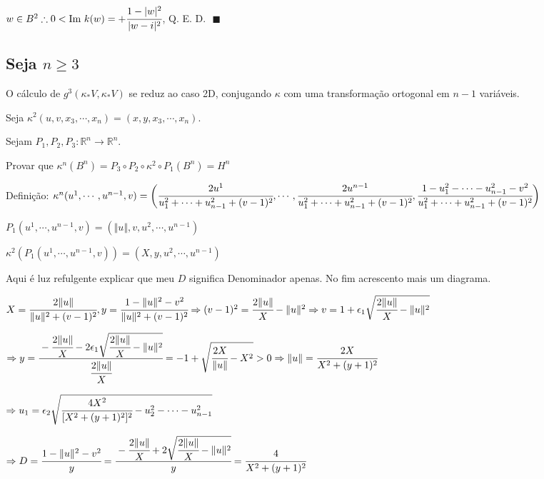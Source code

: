 \documentclass[10pt,a4paper]{article}
\begin{document}
		$w \in B^2 \therefore 0 < \text{Im } k(w) = + \cfrac{1 - \vert w \vert^2}{\vert w - i \vert^2}$, Q. E. D. $\,\,\blacksquare$

		\subsection{Seja $n \ge 3$}
		\begin{flushright}
		\end{flushright}

		O c\'alculo de $g^3 (\kappa_* V, \kappa_* V)$ se reduz ao caso 2D, conjugando $\kappa$ com uma transforma\c{c}\~ao ortogonal em $n - 1$ vari\'aveis.

		Seja $\kappa^2(u, v, x_3, \cdots, x_n) = (x, y, x_3, \cdots, x_n)$.

		Sejam $P_1, P_2, P_3 : \mathbb{R}^n \rightarrow \mathbb{R}^n$.

		Provar que $\kappa^n(B^n) = P_3 \circ P_2 \circ \kappa^2 \circ P_1 (B^n) = H^n$

		Defini\c{c}\~ao: $\kappa^n(u^1, \cdots, u^{n-1}, v) = \bigg( \cfrac{2 u^1}{u_1^2 + \cdots + u_{n-1}^2 + (v - 1)^2}, \cdots, \cfrac{2 u^{n-1}}{u_1^2 + \cdots + u_{n-1}^2 + (v - 1)^2}, \cfrac{1 - u_1^2 - \cdots - u_{n-1}^2 - v^2}{u_1^2 + \cdots + u_{n-1}^2 + (v - 1)^2}  \bigg)$

		$P_1(u^1, \cdots, u^{n-1}, v) = (\Vert u \Vert, v, u^2, \cdots, u^{n-1})$

		$\kappa^2(P_1(u^1, \cdots, u^{n-1}, v)) = (X, y, u^2, \cdots, u^{n-1})$

		Aqui \'e luz refulgente explicar que meu $D$ significa Denominador apenas. No fim acrescento mais um diagrama.

		$X = \cfrac{2 \Vert u \Vert}{\Vert u \Vert^2 + (v - 1)^2}, y = \cfrac{1 - \Vert u \Vert^2 - v^2}{\Vert u \Vert^2 + (v - 1)^2} \Rightarrow (v - 1)^2 = \cfrac{2 \Vert u \Vert}{X} - \Vert u \Vert^2 \Rightarrow v = 1 + \epsilon_1 \sqrt{\cfrac{2 \Vert u \Vert}{X} - \Vert u \Vert^2}$

		$\Rightarrow y = \cfrac{- \cfrac{2 \Vert u \Vert}{X} - 2 \epsilon_1 \sqrt{\cfrac{2 \Vert u \Vert}{X} - \Vert u \Vert^2}}{\cfrac{2 \Vert u \Vert}{X}} = -1 + \sqrt{\cfrac{2X}{\Vert u \Vert} - X^2} > 0 \Rightarrow \Vert u \Vert  = \cfrac{2X}{X^2 + (y + 1)^2}$

		$\Rightarrow u_1 = \epsilon_2 \sqrt{\cfrac{4X^2}{[X^2 + (y + 1)^2]^2} - u_2^2 - \cdots - u_{n - 1}^2}$

		$\Rightarrow D = \cfrac{1 - \Vert u \Vert^2 - v^2}{y} = \cfrac{- \cfrac{2 \Vert u \Vert}{X} + 2 \sqrt{\cfrac{2 \Vert u \Vert}{X} - \Vert u \Vert^2}}{y} = \cfrac{4}{X^2 + (y + 1)^2} $
\end{document}
